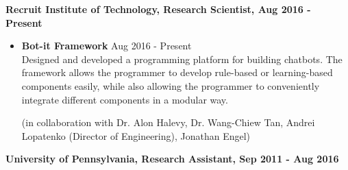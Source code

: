 {\bf Recruit Institute of Technology, Research Scientist, Aug 2016 - Present}
\begin{itemize}
\item{\bf Bot-it Framework} \hfill Aug 2016 - Present \\
Designed and developed a programming platform for building chatbots. The
framework allows the programmer to develop rule-based or learning-based components
easily, while also allowing the programmer to conveniently integrate different
components in a modular way.

(in collaboration with Dr. Alon Halevy, Dr. Wang-Chiew Tan, Andrei Lopatenko
(Director of Engineering), Jonathan Engel)
\end{itemize}


{\bf University of Pennsylvania, Research Assistant, Sep 2011 - Aug 2016}

